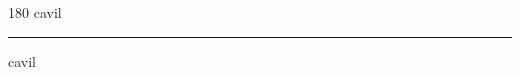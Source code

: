 
\begin{frame}
\begin{center}
\begin{turn}{180}
{\fontsize{2.5cm}{1em}\selectfont cavil}
\end{turn}
\vspace{1em}\par  
\hrule
\vspace{1em}\par  
{\fontsize{2.5cm}{1em}\selectfont cavil}
\end{center}
\end{frame}
